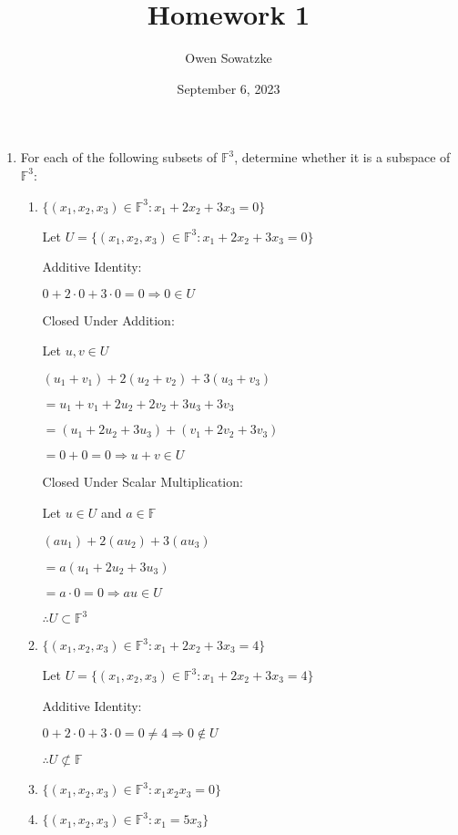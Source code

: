 \documentclass{article}
\title{Homework 1}
\author{Owen Sowatzke}
\date{September 6, 2023}
\begin{document}
	\setlength{\abovedisplayskip}{0pt}
	\setlength{\belowdisplayskip}{0pt}
	\setlength{\abovedisplayshortskip}{0pt}
	\setlength{\belowdisplayshortskip}{0pt}
	\doublespacing
	\maketitle
	
	\begin{enumerate}[nolistsep]
	
		\item For each of the following subsets of $\mathbb{F}^3$, determine whether it is a subspace of $\mathbb{F}^3$:
		
		\begin{enumerate}[nolistsep]
		
			\item ${\{(x_1, x_2, x_3) \in \mathbb{F}^3 : x_1 + 2x_2 + 3x_3 = 0 \}}$
			
			Let $U = {\{(x_1, x_2, x_3) \in \mathbb{F}^3 : x_1 + 2x_2 + 3x_3 = 0 \}}$
			
			Additive Identity:
			
			$ 0 + 2 \cdot 0 + 3 \cdot 0 = 0 \Rightarrow 0 \in U $
			
			Closed Under Addition:
			
			Let $u,v \in U$
			
			$(u_1 + v_1) + 2(u_2 + v_2) + 3(u_3 + v_3)$
			
			$ = u_1 + v_1 + 2u_2 + 2v_2 + 3u_3 + 3v_3$
			
			$ = (u_1 + 2u_2 + 3u_3) + (v_1 + 2v_2 + 3v_3)$
			
			$ = 0 + 0 = 0 \Rightarrow u + v \in U$
			
			Closed Under Scalar Multiplication:
			
			Let $u \in U$ and $a \in \mathbb{F}$
			
			$(au_1) + 2(au_2) + 3(au_3)$
			
			$ = a(u_1 + 2u_2 + 3u_3)$
			
			$ = a \cdot 0 = 0 \Rightarrow au \in U$
			
			$ \therefore U \subset \mathbb{F}^3$
			
			\item ${\{(x_1, x_2, x_3) \in \mathbb{F}^3 : x_1 + 2x_2 + 3x_3 = 4 \}}$
			
			Let $U = {\{(x_1, x_2, x_3) \in \mathbb{F}^3 : x_1 + 2x_2 + 3x_3 = 4 \}}$
			
			Additive Identity:
			
			$0 + 2 \cdot 0 + 3 \cdot 0 = 0 \neq 4 \Rightarrow 0 \notin U$
			
			$\therefore U \not\subset \mathbb{F}$
			
			
			\item ${\{(x_1, x_2, x_3) \in \mathbb{F}^3 : x_1x_2x_3 = 0 \}}$
			
			
			\item ${\{(x_1, x_2, x_3) \in \mathbb{F}^3 : x_1 = 5x_3 \}}$
		\end{enumerate}
	\end{enumerate}
\end{document}
